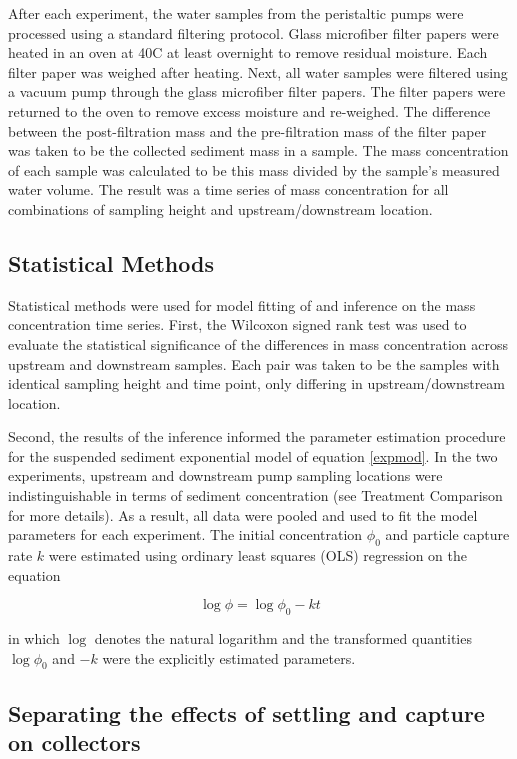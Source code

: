 \documentclass[12pt]{article}
\begin{document}
After each experiment, the water samples from the peristaltic pumps were processed using a standard filtering protocol. Glass microfiber filter papers were heated in an oven at 40\textdegree C at least overnight to remove residual moisture. Each filter paper was weighed after heating. Next, all water samples were filtered using a vacuum pump through the glass microfiber filter papers. The filter papers were returned to the oven to remove excess moisture and re-weighed. The difference between the post-filtration mass and the pre-filtration mass of the filter paper was taken to be the collected sediment mass in a sample. The mass concentration of each sample was calculated to be this mass divided by the sample’s measured water volume. The result was a time series of mass concentration for all combinations of sampling height and upstream/downstream location.

\subsection{Statistical Methods}

Statistical methods were used for model fitting of and inference on the mass concentration time series. First, the Wilcoxon signed rank test was used to evaluate the statistical significance of the differences in mass concentration across upstream and downstream samples. Each pair was taken to be the samples with identical sampling height and time point, only differing in upstream/downstream location.

Second, the results of the inference informed the parameter estimation procedure for the suspended sediment exponential model of equation \ref{expmod}. In the two experiments, upstream and downstream pump sampling locations were indistinguishable in terms of sediment concentration (see Treatment Comparison for more details). As a result, all data were pooled and used to fit the model parameters for each experiment. The initial concentration $\phi_0$ and particle capture rate $k$ were estimated using ordinary least squares (OLS) regression on the equation

\begin{equation} \label{logconc}
    \log{\phi}=\log{\phi_0}-kt
\end{equation}

\noindent in which $\log$ denotes the natural logarithm and the transformed quantities $\log{\phi_0}$ and $-k$ were the explicitly estimated parameters.

\subsection{Separating the effects of settling and capture on collectors}
\end{document}
